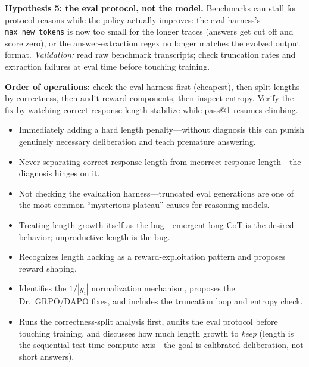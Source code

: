 \begin{interviewq}
\textbf{Hypothesis 5: the eval protocol, not the model.} Benchmarks can stall for protocol reasons while the policy actually improves: the eval harness's \texttt{max\_new\_tokens} is now too small for the longer traces (answers get cut off and score zero), or the answer-extraction regex no longer matches the evolved output format. \textit{Validation:} read raw benchmark transcripts; check truncation rates and extraction failures at eval time before touching training.

\textbf{Order of operations:} check the eval harness first (cheapest), then split lengths by correctness, then audit reward components, then inspect entropy. Verify the fix by watching correct-response length stabilize while pass@1 resumes climbing.

\redflags
\begin{itemize}
    \item Immediately adding a hard length penalty---without diagnosis this can punish genuinely necessary deliberation and teach premature answering.
    \item Never separating correct-response length from incorrect-response length---the diagnosis hinges on it.
    \item Not checking the evaluation harness---truncated eval generations are one of the most common ``mysterious plateau'' causes for reasoning models.
    \item Treating length growth itself as the bug---emergent long CoT is the desired behavior; unproductive length is the bug.
\end{itemize}


\goodgreat
\begin{itemize}
    \item {} Recognizes length hacking as a reward-exploitation pattern and proposes reward shaping.
    \item {} Identifies the $1/|y_i|$ normalization mechanism, proposes the Dr.~GRPO/DAPO fixes, and includes the truncation loop and entropy check.
    \item {} Runs the correctness-split analysis first, audits the eval protocol before touching training, and discusses how much length growth to \textit{keep} (length is the sequential test-time-compute axis---the goal is calibrated deliberation, not short answers).
\end{itemize}

\end{interviewq}

